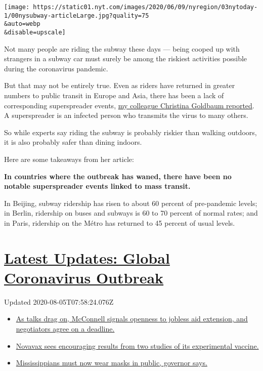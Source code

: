 \texttt{[image: https://static01.nyt.com/images/2020/06/09/nyregion/03nytoday-1/00nysubway-articleLarge.jpg?quality=75\\\&auto=webp\\\&disable=upscale]}

Not many people are riding the subway these days --- being cooped up
with strangers in a subway car must surely be among the riskiest
activities possible during the coronavirus pandemic.

But that may not be entirely true. Even as riders have returned in
greater numbers to public transit in Europe and Asia, there has been a
lack of corresponding superspreader events,
\href{https://www.nytimes.com/2020/08/02/nyregion/nyc-subway-coronavirus-safety.html}{my
colleague Christina Goldbaum reported}. A superspreader is an infected
person who transmits the virus to many others.

So while experts say riding the subway is probably riskier than walking
outdoors, it is also probably safer than dining indoors.

Here are some takeaways from her article:

\textbf{In countries where the outbreak has waned, there have been no
notable superspreader events linked to mass transit.}

In Beijing, subway ridership has risen to about 60 percent of
pre-pandemic levels; in Berlin, ridership on buses and subways is 60 to
70 percent of normal rates; and in Paris, ridership on the Métro has
returned to 45 percent of usual levels.

\hypertarget{latest-updates-global-coronavirus-outbreak}{%
\section{\texorpdfstring{\href{https://www.nytimes.com/2020/08/04/world/coronavirus-cases.html?action=click\&pgtype=Article\&state=default\&region=MAIN_CONTENT_1\&context=storylines_live_updates}{Latest
Updates: Global Coronavirus
Outbreak}}{Latest Updates: Global Coronavirus Outbreak}}\label{latest-updates-global-coronavirus-outbreak}}

Updated 2020-08-05T07:58:24.076Z

\begin{itemize}
\tightlist
\item
  \href{https://www.nytimes.com/2020/08/04/world/coronavirus-cases.html?action=click\&pgtype=Article\&state=default\&region=MAIN_CONTENT_1\&context=storylines_live_updates\#link-762df92}{As
  talks drag on, McConnell signals openness to jobless aid extension,
  and negotiators agree on a deadline.}
\item
  \href{https://www.nytimes.com/2020/08/04/world/coronavirus-cases.html?action=click\&pgtype=Article\&state=default\&region=MAIN_CONTENT_1\&context=storylines_live_updates\#link-1228a480}{Novavax
  sees encouraging results from two studies of its experimental
  vaccine.}
\item
  \href{https://www.nytimes.com/2020/08/04/world/coronavirus-cases.html?action=click\&pgtype=Article\&state=default\&region=MAIN_CONTENT_1\&context=storylines_live_updates\#link-794484ed}{Mississippians
  must now wear masks in public, governor says.}
\end{itemize}

